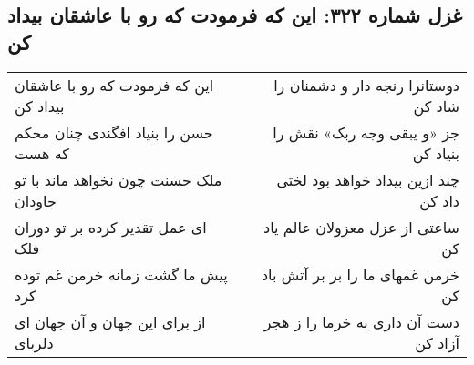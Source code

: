 \begin{center}
\section*{غزل شماره ۳۲۲: این که فرمودت که رو با عاشقان بیداد کن}
\label{sec:322}
\begin{longtable}{l p{0.5cm} r}
این که فرمودت که رو با عاشقان بیداد کن
&&
دوستانرا رنجه دار و دشمنان را شاد کن
\\
حسن را بنیاد افگندی چنان محکم که هست
&&
جز «و یبقی وجه ربک» نقش را بنیاد کن
\\
ملک حسنت چون نخواهد ماند با تو جاودان
&&
چند ازین بیداد خواهد بود لختی داد کن
\\
ای عمل تقدیر کرده بر تو دوران فلک
&&
ساعتی از عزل معزولان عالم یاد کن
\\
پیش ما گشت زمانه خرمن غم توده کرد
&&
خرمن غمهای ما را بر بر آتش باد کن
\\
از برای این جهان و آن جهان ای دلربای
&&
دست آن داری به خرما را ز هجر آزاد کن
\\
\end{longtable}
\end{center}
